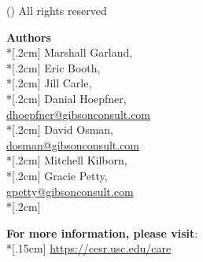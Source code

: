 \cleardoublepage
\pagecolor{gray!33!}
\twocolumn
\thispagestyle{empty}
\vspace*{3in}
{\large  (\the\year) All rights reserved}
\vspace*{6cm}
\newpage

\noindent\textbf{Authors} \\*[.2cm]
Marshall Garland, \\*[.2cm]
Eric Booth, \\*[.2cm]
Jill Carle, \\*[.2cm]
Danial Hoepfner, \\
\href{mailto:dhoepfner@gibsonconsult.com}{dhoepfner@gibsonconsult.com} \\*[.2cm]
David Osman, \\
\href{mailto:dosman@gibsonconsult.com}{dosman@gibsonconsult.com} \\*[.2cm]
Mitchell Kilborn, \\*[.2cm]
Gracie Petty, \\
\href{mailto:gpetty@gibsonconsult.com}{gpetty@gibsonconsult.com} \\*[.2cm]



\begin{center}
\noindent\textbf{For more information, please visit}: \\*[.15cm]
\href{https://cesr.usc.edu/care}{https://cesr.usc.edu/care}

\vspace*{.4cm}

\end{center}
\cleardoublepage
\onecolumn
